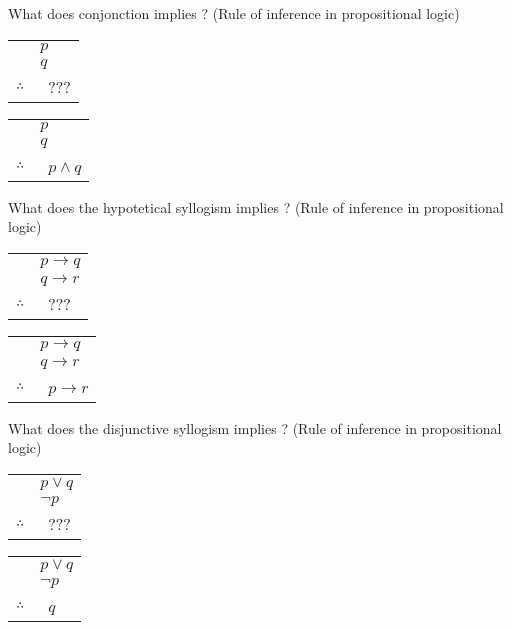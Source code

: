 \documentclass[12pt]{article}
\newcommand*{\xfield}[1]{\begin{mdframed}\centering #1\end{mdframed}\bigskip}
\newenvironment{note}{}{}
\begin{document}
\begin{note}
    \xfield{
        What does conjonction implies ? (Rule of inference in propositional logic) \begin{tabular}{c@{\,}l@{}}
        & $p$ \\
        & $q$ \\\cline{2-2}    $\therefore$         & \ ??? \\  \end{tabular}
    }
    \xfield{
        \begin{tabular}{c@{\,}l@{}}& $p$ \\
        & $q$ \\\cline{2-2}    $\therefore$         & \ $p \wedge q$ \\  \end{tabular}
    }
\end{note}

\begin{note}
    \xfield{
        What does the hypotetical syllogism implies ? (Rule of inference in propositional logic) \begin{tabular}{c@{\,}l@{}}
        & $p \to q$ \\
        & $q \to r$ \\\cline{2-2}    $\therefore$         & \ ??? \\  \end{tabular}
    }
    \xfield{
        \begin{tabular}{c@{\,}l@{}}& $p \to q$ \\
        & $q \to r$ \\\cline{2-2}    $\therefore$         & \ $p \to r$ \\  \end{tabular}
    }
\end{note}

\begin{note}
    \xfield{
        What does the disjunctive syllogism implies ? (Rule of inference in propositional logic) \begin{tabular}{c@{\,}l@{}}
        & $p \vee q$ \\
        & $\neg p$ \\\cline{2-2}    $\therefore$         & \ ??? \\  \end{tabular}
    }
    \xfield{
        \begin{tabular}{c@{\,}l@{}}& $p \vee q$ \\
        & $\neg p$ \\\cline{2-2}    $\therefore$         & \ $q$ \\  \end{tabular}
    }
\end{note}
\end{document}
